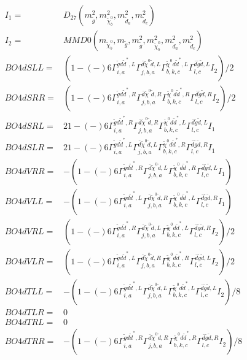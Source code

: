 \documentclass[A4,landscape]{article}
\begin{document}
\begin{align} 
I_1 = & D_{27}(m^2_{\tilde{g}}, m^2_{\tilde{\chi}^0_{{b}}}, m^2_{\tilde{d}_{{a}}}, m^2_{\tilde{d}_{{c}}}) \\ 
I_2 = & MMD0(m_{\tilde{\chi}^0_{{b}}}, m_{\tilde{g}}, m^2_{\tilde{g}}, m^2_{\tilde{\chi}^0_{{b}}}, m^2_{\tilde{d}_{{a}}}, m^2_{\tilde{d}_{{c}}}) \\ 
  BO4dSLL= & (  1
-(-)
  6 \Gamma^{\tilde{g} d \tilde{d}^*,L}_{i, a} \Gamma^{\bar{d}\tilde{\chi}^0 \tilde{d} ,L}_{j, b, a} \Gamma^{\tilde{\chi}^0 d \tilde{d}^*,L}_{b, k, c} \Gamma^{\bar{d}\tilde{g} \tilde{d} ,L}_{l, c} I_2)/2 \\ 
  BO4dSRR= & (  1
-(-)
  6 \Gamma^{\tilde{g} d \tilde{d}^*,R}_{i, a} \Gamma^{\bar{d}\tilde{\chi}^0 \tilde{d} ,R}_{j, b, a} \Gamma^{\tilde{\chi}^0 d \tilde{d}^*,R}_{b, k, c} \Gamma^{\bar{d}\tilde{g} \tilde{d} ,R}_{l, c} I_2)/2 \\ 
  BO4dSRL= & 2   1
-(-)
  6 \Gamma^{\tilde{g} d \tilde{d}^*,R}_{i, a} \Gamma^{\bar{d}\tilde{\chi}^0 \tilde{d} ,R}_{j, b, a} \Gamma^{\tilde{\chi}^0 d \tilde{d}^*,L}_{b, k, c} \Gamma^{\bar{d}\tilde{g} \tilde{d} ,L}_{l, c} I_1 \\ 
  BO4dSLR= & 2   1
-(-)
  6 \Gamma^{\tilde{g} d \tilde{d}^*,L}_{i, a} \Gamma^{\bar{d}\tilde{\chi}^0 \tilde{d} ,L}_{j, b, a} \Gamma^{\tilde{\chi}^0 d \tilde{d}^*,R}_{b, k, c} \Gamma^{\bar{d}\tilde{g} \tilde{d} ,R}_{l, c} I_1 \\ 
  BO4dVRR= & -(  1
-(-)
  6 \Gamma^{\tilde{g} d \tilde{d}^*,R}_{i, a} \Gamma^{\bar{d}\tilde{\chi}^0 \tilde{d} ,L}_{j, b, a} \Gamma^{\tilde{\chi}^0 d \tilde{d}^*,R}_{b, k, c} \Gamma^{\bar{d}\tilde{g} \tilde{d} ,L}_{l, c} I_1) \\ 
  BO4dVLL= & -(  1
-(-)
  6 \Gamma^{\tilde{g} d \tilde{d}^*,L}_{i, a} \Gamma^{\bar{d}\tilde{\chi}^0 \tilde{d} ,R}_{j, b, a} \Gamma^{\tilde{\chi}^0 d \tilde{d}^*,L}_{b, k, c} \Gamma^{\bar{d}\tilde{g} \tilde{d} ,R}_{l, c} I_1) \\ 
  BO4dVRL= & (  1
-(-)
  6 \Gamma^{\tilde{g} d \tilde{d}^*,R}_{i, a} \Gamma^{\bar{d}\tilde{\chi}^0 \tilde{d} ,L}_{j, b, a} \Gamma^{\tilde{\chi}^0 d \tilde{d}^*,L}_{b, k, c} \Gamma^{\bar{d}\tilde{g} \tilde{d} ,R}_{l, c} I_2)/2 \\ 
  BO4dVLR= & (  1
-(-)
  6 \Gamma^{\tilde{g} d \tilde{d}^*,L}_{i, a} \Gamma^{\bar{d}\tilde{\chi}^0 \tilde{d} ,R}_{j, b, a} \Gamma^{\tilde{\chi}^0 d \tilde{d}^*,R}_{b, k, c} \Gamma^{\bar{d}\tilde{g} \tilde{d} ,L}_{l, c} I_2)/2 \\ 
  BO4dTLL= & -(  1
-(-)
  6 \Gamma^{\tilde{g} d \tilde{d}^*,L}_{i, a} \Gamma^{\bar{d}\tilde{\chi}^0 \tilde{d} ,L}_{j, b, a} \Gamma^{\tilde{\chi}^0 d \tilde{d}^*,L}_{b, k, c} \Gamma^{\bar{d}\tilde{g} \tilde{d} ,L}_{l, c} I_2)/8 \\ 
  BO4dTLR= & 0 \\ 
  BO4dTRL= & 0 \\ 
  BO4dTRR= & -(  1
-(-)
  6 \Gamma^{\tilde{g} d \tilde{d}^*,R}_{i, a} \Gamma^{\bar{d}\tilde{\chi}^0 \tilde{d} ,R}_{j, b, a} \Gamma^{\tilde{\chi}^0 d \tilde{d}^*,R}_{b, k, c} \Gamma^{\bar{d}\tilde{g} \tilde{d} ,R}_{l, c} I_2)/8 \\ 
\end{align} 
\end{document}
